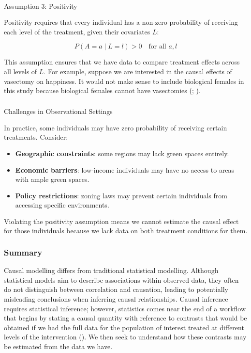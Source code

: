 \documentclass[
  singlecolumn]{article}
\makeatletter
\let\oldparagraph\paragraph
\renewcommand{\paragraph}{
    \@ifstar
      \xxxParagraphStar
      \xxxParagraphNoStar
  }
\newcommand{\xxxParagraphStar}[1]{\oldparagraph*{#1}\mbox{}}
\newcommand{\xxxParagraphNoStar}[1]{\oldparagraph{#1}\mbox{}}
\let\oldsubparagraph\subparagraph
\renewcommand{\subparagraph}{
    \@ifstar
      \xxxSubParagraphStar
      \xxxSubParagraphNoStar
  }
\newcommand{\xxxSubParagraphStar}[1]{\oldsubparagraph*{#1}\mbox{}}
\newcommand{\xxxSubParagraphNoStar}[1]{\oldsubparagraph{#1}\mbox{}}
\providecommand{\tightlist}{%
  \setlength{\itemsep}{0pt}\setlength{\parskip}{0pt}}\usepackage{longtable,booktabs,array}
\makeatother
\begin{document}
\paragraph{Assumption 3: Positivity}\label{assumption-3-positivity}

Positivity requires that every individual has a non-zero probability of
receiving each level of the treatment, given their covariates \(L\):

\[
P(A = a \mid L = l) > 0 \quad \text{for all } a, l
\]

This assumption ensures that we have data to compare treatment effects
across all levels of \(L\). For example, suppose we are interested in
the causal effects of vasectomy on happiness. It would not make sense to
include biological females in this study because biological females
cannot have vasectomies (; ).

\subparagraph{Challenges in Observational
Settings}\label{challenges-in-observational-settings-2}

In practice, some individuals may have zero probability of receiving
certain treatments. Consider:

\begin{itemize}
\tightlist
\item
  \textbf{Geographic constraints}: some regions may lack green spaces
  entirely.
\item
  \textbf{Economic barriers}: low-income individuals may have no access
  to areas with ample green spaces.
\item
  \textbf{Policy restrictions}: zoning laws may prevent certain
  individuals from accessing specific environments.
\end{itemize}

Violating the positivity assumption means we cannot estimate the causal
effect for those individuals because we lack data on both treatment
conditions for them.

\subsubsection{Summary}\label{summary}

Causal modelling differs from traditional statistical modelling.
Although statistical models aim to describe associations within observed
data, they often do not distinguish between correlation and causation,
leading to potentially misleading conclusions when inferring causal
relationships. Causal inference requires statistical inference; however,
statistics comes near the end of a workflow that begins by stating a
causal quantity with reference to contrasts that would be obtained if we
had the full data for the population of interest treated at different
levels of the intervention (). We then seek to understand how these contrasts may be
estimated from the data we have.
\end{document}
